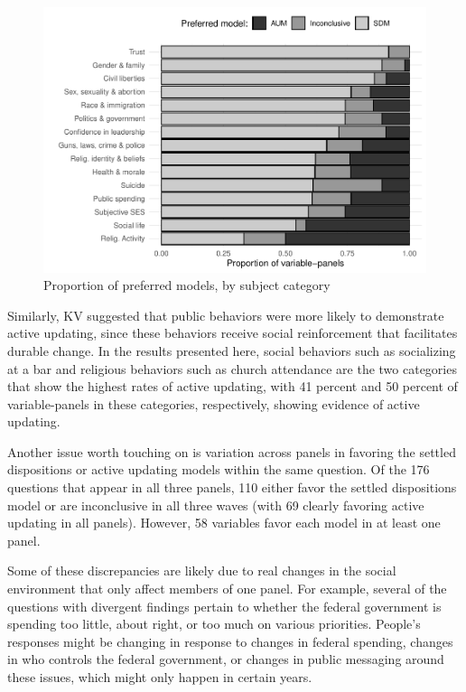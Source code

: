 \documentclass[
  11pt,
]{article}
\begin{document}
\begin{figure}

{\centering \includegraphics{ms_files/figure-latex/categories-1} 

}

\caption{Proportion of preferred models, by subject category}\label{fig:categories}
\end{figure}

Similarly, KV suggested that public behaviors were more likely to demonstrate active updating, since these behaviors receive social reinforcement that facilitates durable change. In the results presented here, social behaviors such as socializing at a bar and religious behaviors such as church attendance are the two categories that show the highest rates of active updating, with 41 percent and 50 percent of variable-panels in these categories, respectively, showing evidence of active updating.

Another issue worth touching on is variation across panels in favoring the settled dispositions or active updating models within the same question. Of the 176 questions that appear in all three panels, 110 either favor the settled dispositions model or are inconclusive in all three waves (with 69 clearly favoring active updating in all panels). However, 58 variables favor each model in at least one panel.

Some of these discrepancies are likely due to real changes in the social environment that only affect members of one panel. For example, several of the questions with divergent findings pertain to whether the federal government is spending too little, about right, or too much on various priorities. People's responses might be changing in response to changes in federal spending, changes in who controls the federal government, or changes in public messaging around these issues, which might only happen in certain years.
\end{document}

